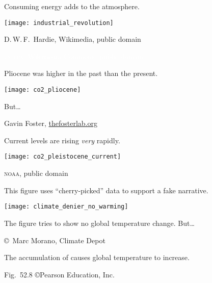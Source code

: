 \documentclass[t]{beamer}
\begin{document}
%
\begin{frame}[t]{Consuming energy adds  to the atmosphere.}

	\texttt{[image: industrial\_revolution]}

	\vfilll
	
	\hfill \tiny D.\,W.\,F.~Hardie, Wikimedia, public domain

\end{frame}
%
{
\begin{frame}[b]

	\hfill \tiny \textcolor{white}{\textsc{us epa}, Wikimedia Commons, public domain}
\end{frame}
}
%
\begin{frame}{Pliocene  was higher in the past than the present.}
	
	\texttt{[image: co2\_pliocene]}\par
	
	\hangpara But\dots
	
	\vfilll
	
	\hfill \tiny Gavin Foster, \href{http://www.thefosterlab.org/blog/2015/11/11/is-this-the-last-year-below-400-ppm}{thefosterlab.org}
\end{frame}
%
\begin{frame}{Current  levels are rising \emph{very} rapidly.}
	
	{\centering
		\texttt{[image: co2\_pleistocene\_current]}\par
	}
	
	\vfilll
	
	\hfill \tiny \textsc{noaa}, public domain
\end{frame}
%
\begin{frame}[t]{This figure uses “cherry-picked” data to support a fake narrative.}
	
	{\centering
		\texttt{[image: climate\_denier\_no\_warming]}\par
	}
	
	The figure tries to show no global temperature change. But\dots
	
	\vfilll
	
	\hfill \tiny \copyright~Marc Morano, Climate Depot
\end{frame}
%
{
\begin{frame}[b]{The accumulation of  causes global temperature to increase.}

	\hfill \tiny Fig.~52.8 \copyright Pearson Education, Inc.
\end{frame}
}
%
\end{document}
